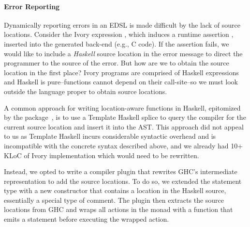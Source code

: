 

\paragraph{Error Reporting}



Dynamically reporting errors in an EDSL is made difficult by the lack of
source locations. Consider the Ivory expression \hbox{,} which induces a
runtime assertion , inserted into the generated back-end (e.g., C code). If the assertion fails, we would like to include
a \emph{Haskell} source location in the error message to direct the programmer to the source of
the error. But how are we to obtain the source location in the first place?
Ivory programs are comprised of Haskell expressions and Haskell is
pure--functions cannot depend on their call-site--so we must look outside the
language proper to obtain source locations.

A common approach for writing location-aware functions in Haskell, epitomized by
the  package~\cite{file-location}, is to use a Template
Haskell splice to query the compiler for the current source location and insert
it into the AST. This approach did not appeal to us as Template Haskell incurs
considerable syntactic overhead and is incompatible with the concrete syntax
described above, and we already had 10+ KLoC of Ivory implementation which would need to be
rewritten.

Instead, we opted to write a compiler plugin that rewrites GHC's intermediate
representation to add the source locations. To do so, we extended the  statement type with a new
 constructor that contains a location in the Haskell source,
essentially a special type of comment. The plugin then extracts the source
locations from GHC and wraps all actions in the  monad with a
 function that emits a  statement before executing
the wrapped action.

